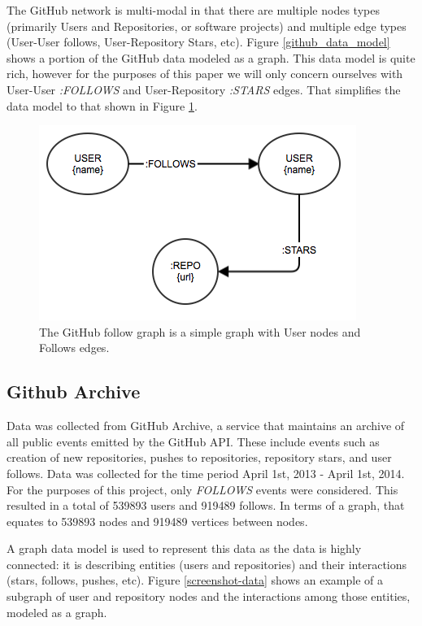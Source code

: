 The GitHub network is multi-modal in that there are multiple nodes types (primarily Users and Repositories, or software projects) and multiple edge types (User-User follows, User-Repository Stars, etc). Figure \ref{github_data_model} shows a portion of the GitHub data modeled as a graph. This data model is quite rich, however for the purposes of this paper we will only concern ourselves with User-User \textit{:FOLLOWS} and User-Repository \textit{:STARS} edges. That simplifies the data model to that shown in Figure \ref{github_simplified_data_model}.


\begin{figure}[ht]
\vskip 0.2in
\begin{center}
\centerline{\includegraphics[width=0.3\columnwidth]{images/user_user.png}}
\caption[User-User data model]{The GitHub follow graph is a simple graph with User nodes and Follows edges.}
\label{github_simplified_data_model}
\end{center}
\vskip -0.2in
\end{figure} 

\subsection{Github Archive}
Data was collected from GitHub Archive\cite{githubarchive}, a service that maintains an archive of all public events emitted by the GitHub API\cite{github:Online}. These include events such as creation of new repositories, pushes to repositories, repository stars, and user follows. Data was collected for the time period April 1st, 2013 - April 1st, 2014. For the purposes of this project, only \textit{FOLLOWS} events were considered. This resulted in a total of 539893 users and 919489 follows. In terms of a graph, that equates to 539893 nodes and 919489 vertices between nodes.

A graph data model is used to represent this data as the data is highly connected: it is describing entities (users and repositories) and their interactions (stars, follows, pushes, etc). Figure \ref{screenshot-data} shows an example of a subgraph of user and repository nodes and the interactions among those entities, modeled as a graph.

